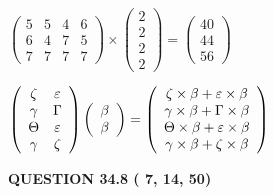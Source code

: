 \documentclass[12pt]{article}
\begin{document}
 
$\left( \begin{array}{ccccccccccccccc}
           5 & 
           5 & 
           4 & 
           6 \\ 
           6 & 
           4 & 
           7 & 
           5 \\ 
           7 & 
           7 & 
           7 & 
           7
\end{array}\right) \times
\left( \begin{array}{c}
           2 \\ 
           2 \\ 
           2 \\ 
           2
\end{array}\right)  =
\left( \begin{array}{c}
          40 \\ 
          44 \\ 
          56
\end{array}\right)  $
 
$  %
 \left( \begin{array}
 {
 c
 c
 }
                    \zeta & 
 \varepsilon \\ 
 \gamma & 
 \Gamma \\ 
 \Theta & 
 \varepsilon \\ 
 \gamma & 
                    \zeta
 \end{array} \right)
 \left( \begin{array}
 {
 c
 }
 \beta \\ 
 \beta
 \end{array} \right)
=
  \left( \begin{array}
 {
 c
 }
                    \zeta \times  \beta   +  \varepsilon \times  \beta \\ 
 \gamma \times  \beta   +  \Gamma \times  \beta \\ 
 \Theta \times  \beta   +  \varepsilon \times  \beta \\ 
 \gamma \times  \beta   +                     \zeta \times  \beta
 \end{array} \right)
$
 
 
 
 
 
\noindent{}

 
 
  
\vspace{0.2in}
  
{\textbf{\Large{QUESTION
34.8 
 (          7,         14,         50)
}}}
  
\end{document}

